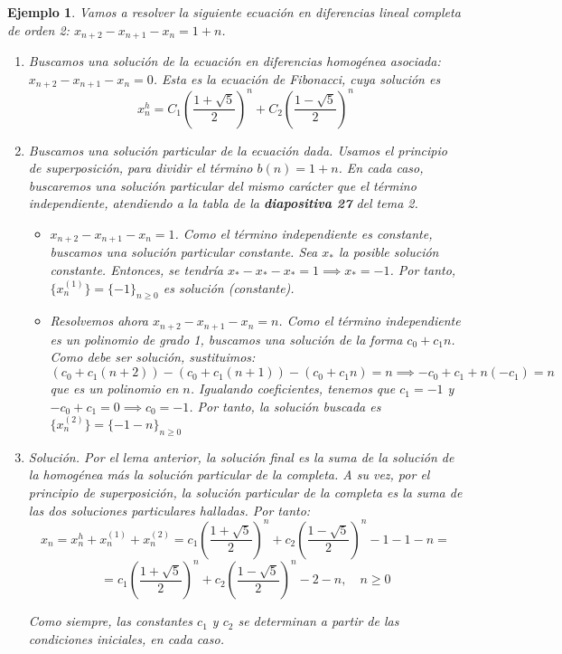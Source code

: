 \documentclass[11pt, a4paper]{article}
\newif\IfInSansMode
\numberwithin{equation}{section}
\theoremstyle{theorem-style}
\theoremstyle{definition-style}
\theoremstyle{remark-style}
\theoremstyle{example-style}
\newtheorem{ejemplo}{Ejemplo}[section]
\begin{document}
\begin{ejemplo}
	Vamos a resolver la siguiente ecuación en diferencias lineal completa de orden 2: $x _{n+2} - x _{n+1}  - x_n = 1+n$.
	\begin{enumerate}
	\item Buscamos una solución de la ecuación en diferencias homogénea asociada:\\ $x _{n+2} - x _{n+1} - x_n = 0$. Esta es la ecuación de Fibonacci, cuya solución es $$x_n^h = C_1\left(\frac{1+ \sqrt 5}{2}\right)^n + C_2 \left( \frac{1-\sqrt 5}{2}\right)^n$$
	\item Buscamos una solución particular de la ecuación dada.  Usamos el principio de superposición, para dividir el término $b(n)=1+n$. En cada caso, buscaremos una solución particular del mismo carácter que el término independiente, atendiendo a la tabla de la \textbf{diapositiva 27} del tema 2.
	
\begin{itemize}
	\item $x _{n+2} - x_{n+1} - x_n = 1$. Como el término independiente es constante, buscamos una solución particular constante. Sea $x_*$ la posible solución constante. Entonces, se tendría $x_* - x_* - x_* = 1 \implies x_* = -1$. Por tanto,\\ $\{x_n^{(1)}\} = \{-1\}_{n\ge0}$ es solución (constante).
	
	\item Resolvemos ahora $x _{n+2} - x _{n+1} - x_n = n$. Como el término independiente es un polinomio de grado 1, buscamos una solución de la forma $c_0 + c_1 n$. Como debe ser solución, sustituimos:
	\[
	(c_0 + c_1(n+2)) -(c_0 + c_1(n+1)) - (c_0 + c_1 n) = n \implies -c_0 + c_1 +n(-c_1) = n 
	\] que es un polinomio en $n$. Igualando coeficientes, tenemos que $c_1 = -1 $ y $-c_0 + c_1 = 0 \implies c_0 = -1$. Por tanto, la solución buscada es\\ $\{x_n^{(2)}\} = \{-1 - n\}_{n\ge0}$
\end{itemize}
	
	
	
	\item Solución. Por el lema anterior, la solución final es la suma de la solución de la homogénea más la solución particular de la completa. A su vez, por el \textit{principio de superposición}, la solución particular de la completa es la suma de las dos soluciones particulares halladas. Por tanto:
	\[
	x_n = x_n^h + x_n^{(1)} +  x_n^{(2)} =  c_1\left(\frac{1+ \sqrt 5}{2}\right)^n + c_2 \left(\frac{1-\sqrt 5}{2}\right)^n -1-1-n = 
	\]
	\[
	=  c_1\left(\frac{1+ \sqrt 5}{2}\right)^n + c_2 \left(\frac{1-\sqrt 5}{2}\right)^n -2 - n, \quad n \ge 0
	\]
	
	Como siempre, las constantes $c_1$ y $c_2$ se determinan a partir de las condiciones iniciales, en cada caso.
\end{enumerate}
\end{ejemplo}
\end{document}
